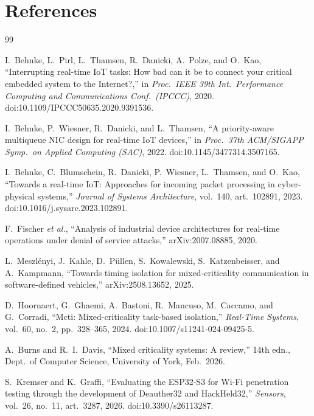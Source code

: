\chapter*{References}

\begin{thebibliography}{99}
\small

 I.~Behnke, L.~Pirl, L.~Thamsen, R.~Danicki, A.~Polze, and O.~Kao,
``Interrupting real-time IoT tasks: How bad can it be to connect your critical embedded system to
the Internet?,'' in \emph{Proc.\ IEEE 39th Int.\ Performance Computing and Communications Conf.\
(IPCCC)}, 2020. doi:10.1109/IPCCC50635.2020.9391536.

 I.~Behnke, P.~Wiesner, R.~Danicki, and L.~Thamsen, ``A priority-aware
multiqueue NIC design for real-time IoT devices,'' in \emph{Proc.\ 37th ACM/SIGAPP Symp.\ on
Applied Computing (SAC)}, 2022. doi:10.1145/3477314.3507165.

 I.~Behnke, C.~Blumschein, R.~Danicki, P.~Wiesner, L.~Thamsen, and O.~Kao,
``Towards a real-time IoT: Approaches for incoming packet processing in cyber-physical systems,''
\emph{Journal of Systems Architecture}, vol.~140, art.~102891, 2023.
doi:10.1016/j.sysarc.2023.102891.

 F.~Fischer \emph{et al.}, ``Analysis of industrial device architectures for
real-time operations under denial of service attacks,'' arXiv:2007.08885, 2020.

 L.~Meszl\'enyi, J.~Kahle, D.~P\"ullen, S.~Kowalewski, S.~Katzenbeisser,
and A.~Kampmann, ``Towards timing isolation for mixed-criticality communication in
software-defined vehicles,'' arXiv:2508.13652, 2025.

 D.~Hoornaert, G.~Ghaemi, A.~Bastoni, R.~Mancuso, M.~Caccamo, and G.~Corradi,
``Mcti: Mixed-criticality task-based isolation,'' \emph{Real-Time Systems}, vol.~60, no.~2,
pp.~328--365, 2024. doi:10.1007/s11241-024-09425-5.

 A.~Burns and R.~I.~Davis, ``Mixed criticality systems: A review,'' 14th
edn., Dept.\ of Computer Science, University of York, Feb.\ 2026.

 S.~Kremser and K.~Graffi, ``Evaluating the ESP32-S3 for Wi-Fi penetration
testing through the development of Deauther32 and HackHeld32,'' \emph{Sensors}, vol.~26, no.~11,
art.~3287, 2026. doi:10.3390/s26113287.


\end{thebibliography}
